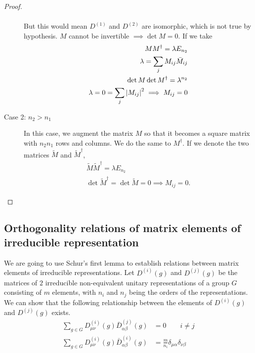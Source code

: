 \begin{proof}
\begin{description}
\begin{align}
    \end{align}
    But this would mean $D^{(1)}$ and $D^{(2)}$ are isomorphic, which is not true
    by hypothesis. $M$ cannot be invertible $\implies\det M=0$.
    If we take
    \begin{align}
        MM^\dagger=\lambda E_{n_2}\\
        \lambda=\sum_j M_{ij}\bar{M}_{ij}\\
        \det M\det M^\dagger=\lambda^{n_2}\\
        \lambda=0=\sum_j\abs{M_{ij}}^2\implies M_{ij}=0
    \end{align}
\item[Case 2: $n_2>n_1$]
    In this case, we augment the matrix $M$ so that it becomes a
    square matrix with $n_2n_1$ rows and columns. We do the same to $M^\dagger$.
    If we denote the two matrices $\widetilde{M}$ and $\widetilde{M}^\dagger$,
    \begin{align}
        \widetilde{M}\widetilde{M}^\dagger = \lambda E_{n_2}\\
        \det\widetilde{M}^\dagger=\det\widetilde{M}=0\implies M_{ij}=0.
    \end{align}
\end{description}
\end{proof}


\subsection{Orthogonality relations of matrix elements of irreducible representation} %
\label{sub:Orthogonality relations of matrix elements of irreducible representation}

We are going to use Schur's first lemma to establish relations between matrix
elements of irreducible representations. Let $D^{(i)}(g)$ and $D^{(j)}(g)$ be
the matrices of $2$ irreducible non-equivalent unitary representations of a group
$G$ consisting of $m$ elements, with $n_i$ and $n_j$ being the orders of the
representations. We can show that the following relationship between the elements
of $D^{(i)}(g)$ and $D^{(j)}(g)$ exists.
\begin{align}
    \sum_{g\in G}D^{(i)}_{\mu\nu}(g)\bar{D}^{(j)}_{\alpha\beta}(g)&=0\qquad i\neq j\\
    \sum_{g\in G}D^{(i)}_{\mu\nu}(g)\bar{D}^{(i)}_{\alpha\beta}(g)&=\frac m{n_i}
    \delta_{\mu\alpha}\delta_{\nu\beta}
\end{align}

